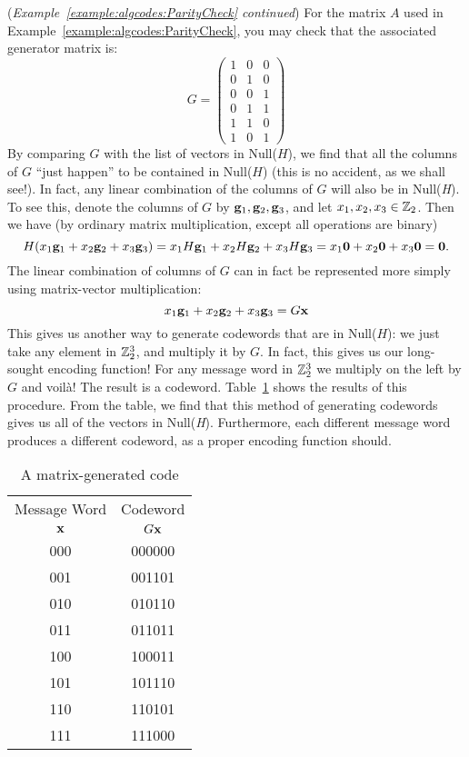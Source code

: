 \begin{example}{}
(\emph{Example~\ref{example:algcodes:ParityCheck} continued})
For the matrix $A$ used in Example~\ref{example:algcodes:ParityCheck}, you may check that the associated generator matrix is:
\[
G=
\left(
\begin{array}{ccc}
1 & 0 & 0 \\
0 & 1 & 0 \\
0 & 0 & 1 \\
0 & 1 & 1 \\
1 & 1 & 0 \\
1 & 0 & 1
\end{array}
\right)
\]
By comparing $G$ with the  list of vectors in Null($H$), we find that all the columns of $G$ ``just happen'' to be  contained in Null($H$) (this is no accident, as we shall see!). In fact, any linear combination of the columns of $G$ will also be in Null(\emph{H}). To see this, denote the columns of $G$ by ${\bold g}_1, {\bold g}_2, {\bold g}_3$, and let $x_1, x_2, x_3 \in {\Bbb Z}_2$. Then  we have (by ordinary matrix multiplication, except all operations are binary)
\[
H (x_1 {\bold g}_1 + x_2{\bold g}_2 + x_3{\bold g}_3) = 
x_1H {\bold g}_1 + x_2H{\bold g}_2 + x_3H{\bold g}_3
= x_1 {\bold 0} + x_2{\bold 0} + x_3{\bold 0} = {\bold 0}.
\]
 The linear combination of columns of $G$ can in fact be represented more simply using matrix-vector multiplication:
\[x_1 {\bold g}_1 + x_2{\bold g}_2 + x_3{\bold g}_3 = G{\bold x} 
\]
This gives us another way to generate codewords that are in Null($H$): we just take any element in ${\Bbb Z}_2^3$, and multiply it by $G$. In fact, this gives us our long-sought encoding function! For any message word in ${\Bbb Z}_2^3$ we multiply on the left by $G$ and voil\`{a}! The result is a codeword.
Table~\ref{table:algcodes:generator} shows the results of this procedure. From the table, we find that this method of generating codewords gives us all of the vectors in Null(\emph{H}). Furthermore, each different message word produces a different codeword, as a proper encoding function should.
 
\begin{table}[htb]
\caption{A matrix-generated code}\label{table:algcodes:generator}{\small
\begin{center}
\begin{tabular}{|c|c|}
\hline
Message Word  & Codeword \\
${\bold x}$ & $G {\bold x}$ \\ \hline
000 & 000000 \\
001 & 001101 \\
010 & 010110 \\
011 & 011011 \\
100 & 100011 \\
101 & 101110 \\
110 & 110101 \\
111 & 111000 \\
\hline
\end{tabular}
\end{center}
}
\end{table}
\end{example}

